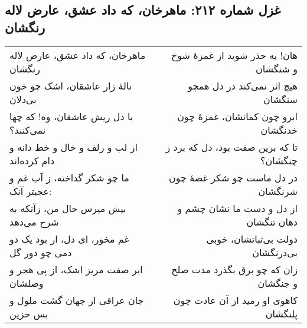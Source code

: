 \begin{center}
\section*{غزل شماره ۲۱۲: ماهرخان، که داد عشق، عارض لاله رنگشان}
\label{sec:212}
\begin{longtable}{l p{0.5cm} r}
ماهرخان، که داد عشق، عارض لاله رنگشان
&&
هان! به حذر شوید از غمزهٔ شوخ و شنگشان
\\
نالهٔ زار عاشقان، اشک چو خون بی‌دلان
&&
هیچ اثر نمی‌کند در دل همچو سنگشان
\\
با دل ریش عاشقان، وه! که چها نمی‌کنند؟
&&
ابرو چون کمانشان، غمزهٔ چون خدنگشان
\\
از لب و زلف و خال و خط دانه و دام کرده‌اند
&&
تا که برین صفت بود، دل که برد ز چنگشان؟
\\
ما چو شکر گداخته، ز آب غم و عجبتر آنک:
&&
در دل ماست چو شکر غصهٔ چون شرنگشان
\\
بیش مپرس حال من، زآنکه به شرح می‌دهد
&&
از دل و دست ما نشان چشم و دهان تنگشان
\\
غم مخور، ای دل، ار بود یک دو دمی چو دور گل
&&
دولت بی‌ثباتشان، خوبی بی‌درنگشان
\\
ابر صفت مریز اشک، از پی هجر و وصلشان
&&
زان که چو برق بگذرد مدت صلح و جنگشان
\\
جان عراقی از جهان گشت ملول و بس حزین
&&
کاهوی او رمید از آن عادت چون پلنگشان
\\
\end{longtable}
\end{center}
